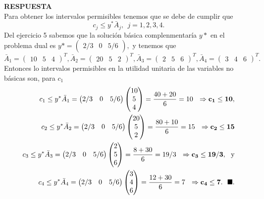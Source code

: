 \documentclass[11pt,letterpaper]{article}
\newcommand{\res}{\textbf{RESPUESTA}\\}
\newcommand{\finf}{\blacksquare.}
\begin{document}
\begin{enumerate}
\res Para obtener los intervalos permisibles tenemos que se debe de cumplir que $$c_j\leq y^*\bar{A}_j, \ \ j=1,2,3,4.$$
Del ejercicio 5 sabemos que la solución básica complenmentaría $y*$ en el problema dual es $y*= \begin{pmatrix}
2/3& 0 & 5/6
\end{pmatrix},$ y tenemos que $\bar{A}_1=\begin{pmatrix} 10 & 5 & 4\end{pmatrix}^T, \bar{A}_2=\begin{pmatrix}20 & 5 & 2\end{pmatrix}^T, \bar{A}_3=\begin{pmatrix} 2 & 5 & 6 \end{pmatrix}^T, \bar{A}_4=\begin{pmatrix} 3 & 4 & 6\end{pmatrix}^T.$ Entonces lo intervalos permisibles en la utilidad unitaria de las variables no básicas son, para $c_1$
\begin{align*}
c_1\leq y^*\bar{A}_1 = \begin{pmatrix}
2/3& 0 & 5/6
\end{pmatrix}\begin{pmatrix} 10 \\
5 \\
4
\end{pmatrix}=\frac{40+20}{6}=10\ \ \bf \Rightarrow c_1\leq 10,\\
c_2\leq y^*\bar{A}_2 = \begin{pmatrix}
2/3& 0 & 5/6
\end{pmatrix}\begin{pmatrix} 20 \\
5 \\
2
\end{pmatrix}=\frac{80+10}{6}=15\ \ \bf \Rightarrow c_2\leq 15\\
c_3\leq y^*\bar{A}_3 = \begin{pmatrix}
2/3& 0 & 5/6
\end{pmatrix}\begin{pmatrix} 2 \\
5 \\
6
\end{pmatrix}=\frac{8+30}{6}=19/3\ \ \bf \Rightarrow c_3\leq 19/3, \ \ \text{y}\\
c_4\leq y^*\bar{A}_4 = \begin{pmatrix}
2/3& 0 & 5/6
\end{pmatrix}\begin{pmatrix} 3 \\
4 \\
6
\end{pmatrix}=\frac{12+30}{6}=7\ \ \bf \Rightarrow c_4\leq 7. \ \ \finf
\end{align*}



\end{enumerate}
\end{document}
